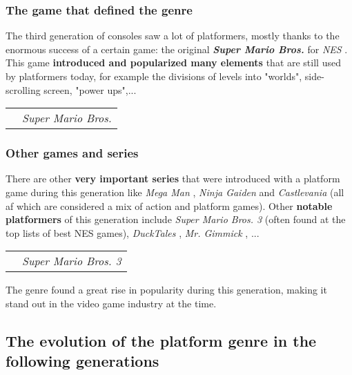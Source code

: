 \documentclass[a4paper,10pt]{book}
\begin{document}
 \subsubsection{The game that defined the genre }
 
 
          The third generation of consoles saw a lot of platformers, mostly thanks to the enormous success of a certain game: the original  \textbf{\textit{Super Mario Bros. }}  for  \textit{NES }.
          This game  \textbf{introduced and popularized many elements }  that are still used by platformers today, for example the divisions of levels into "worlds", side-scrolling screen, "power ups",...  
 
 
 \begin{longtable}{p{1mm}|l|}\hline
 
 & 
 \\\hline
 
 & \textit{Super Mario Bros. }
 \\\hline
 \end{longtable}
 
 \subsubsection{Other games and series }
 
 
          There are other  \textbf{very important series }  that were introduced with a platform game during this generation like  \textit{Mega Man },  \textit{Ninja Gaiden } and  \textit{Castlevania } (all af which are considered a mix of action and platform games).
          Other  \textbf{notable platformers }  of this generation include  \textit{Super Mario Bros. 3 } (often found at the top lists of best NES games),  \textit{DuckTales },  \textit{Mr. Gimmick }, ...  
 
 
 \begin{longtable}{p{1mm}|l|}\hline
 
 & 
 \\\hline
 
 & \textit{Super Mario Bros. 3 }
 \\\hline
 \end{longtable}
 
 
          The genre found a great rise in popularity during this generation, making it stand out in the video game industry at the time.
         
 
 \subsection{The evolution of the platform genre in the following generations }
 
\end{document}
